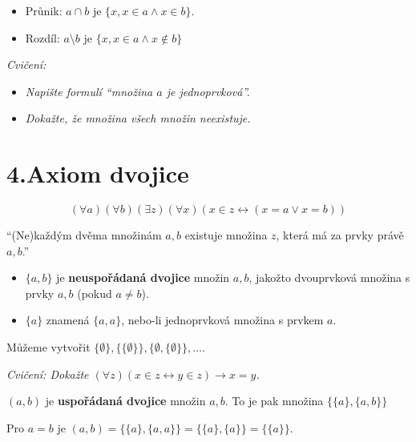 \begin{definice}
	\begin{itemize}
		\item Průnik: $a \cap b$ je $\{x, x \in a \land x \in b\}$.
		\item Rozdíl: $a \setminus b$ je $\{x, x \in a \land x \notin b\}$
	\end{itemize}
\end{definice}

\textit{Cvičení:}

\begin{itemize}
	\item \textit{Napište formulí “množina $a$ je jednoprvková”.}
	\item \textit{Dokažte, že množina všech množin neexistuje.}
\end{itemize}

\section{4.Axiom dvojice}

$$
(\forall a)(\forall b)(\exists z)(\forall x)(x \in z \leftrightarrow (x=a \lor x=b))
$$

“(Ne)každým dvěma množinám $a,b$ existuje množina $z$, která má za prvky právě $a,b$.”

\begin{definice}
	\begin{itemize}
		\item $\{a,b\}$ je \textbf{neuspořádaná dvojice} množin $a,b$, jakožto dvouprvková množina s prvky $a,b$ (pokud $a \neq b$).
		\item $\{a\}$ znamená $\{a,a\}$, nebo-li jednoprvková množina s prvkem $a$.
	\end{itemize}
\end{definice}

\begin{prikl}
	Můžeme vytvořit $\{\emptyset\},\{\{\emptyset\}\}, \{\emptyset,\{\emptyset\}\}, \dots$.
\end{prikl}

\textit{Cvičení: Dokažte $(\forall z)(x \in z \leftrightarrow y \in z) \rightarrow x = y$.}

\begin{definice}
	$(a,b)$ je \textbf{uspořádaná dvojice} množin $a,b$. To je pak množina $\{\{a\},\{a,b\}\}$
\end{definice}

\begin{pozn}
	Pro $a = b$ je $(a,b) = \{\{a\},\{a,a\}\} = \{\{a\},\{a\}\} = \{\{a\}\}$.
\end{pozn}

